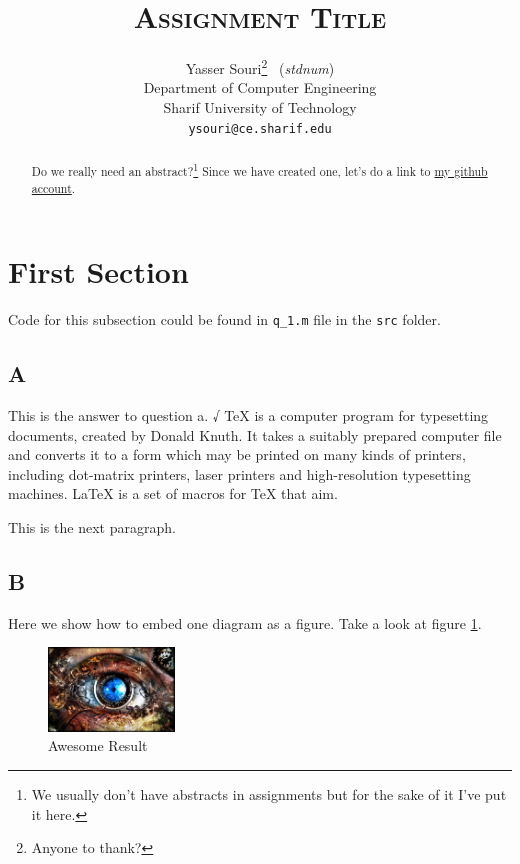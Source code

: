 \documentclass[11pt,a4paper]{article}
\title{\textsc{Assignment Title}}
\author{    Yasser Souri\thanks{Anyone to thank?} \ (\textit{stdnum}) \\
        Department of Computer Engineering\\
        Sharif University of Technology\\
        \texttt{ysouri@ce.sharif.edu}}
\date{}
\begin{document}
\maketitle

\begin{abstract}
Do we really need an abstract?\footnote{We usually don't have abstracts in assignments but for the sake of it I've put it here.}
Since we have created one, let's do a link to \href{https://github.com/yassersouri}{my github account}.
\end{abstract}


\section{First Section}

Code for this subsection could be found in \texttt{q\_1.m} file in the \texttt{src} folder.

\subsection{A}
This is the answer to question a. √ %
\TeX{} is a computer program for typesetting documents, created by Donald Knuth. It takes a suitably prepared computer file and converts it to a form which may be printed on many kinds of printers, including dot-matrix printers, laser printers and high-resolution typesetting machines. \LaTeX{} is a set of macros for \TeX{} that aim.

This is the next paragraph.
\subsection{B}
Here we show how to embed one diagram as a figure. Take a look at figure \ref{fig:awesome_result}.

\begin{figure}[!h] %
    \centering
    \includegraphics[width=0.3\textwidth]{img.jpg}
    \caption{Awesome Result}
    \label{fig:awesome_result}
\end{figure}
\end{document}

